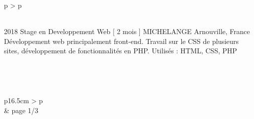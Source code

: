 \documentclass[cv]{cv_style}
\begin{document}
{\begin{tabular}{p{\leftsize\textwidth} > {\arraybackslash}p{\rightsize\textwidth}}
\begin{minipage}[t]{\rightsize\textwidth}
    \vspace{0.6cm}\\


			\frcventry
					{2018\hspace{0.6cm}} 
					{Stage en Developpement Web \hfill [ 2 mois ]}
					{MICHELANGE}
					{Arnouville, France}
					{
						 Développement web principalement front-end. Travail sur le CSS de plusieurs sites, développement de fonctionnalités en PHP. 
					}
					{Utilisés :}
					{HTML, CSS, PHP}


\end{minipage}\\
\end{tabular}

\vspace{0.3cm}\\
\begin{tabular}{p{16.5cm} > {\arraybackslash}p}
\\& page 1/3\\
\end{tabular}

\newpage

\hspace{0.4cm}
\begin{minipage}[t]{\textwidth}


\vspace{1.2cm}\\


\end{minipage}}
\end{document}
